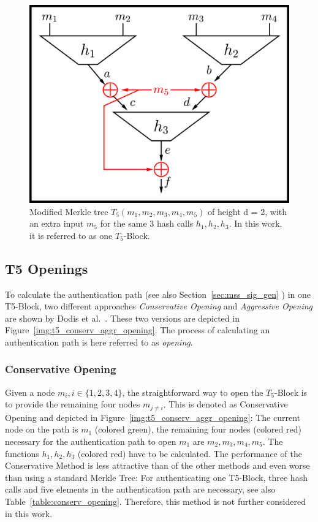 \begin{figure}
\centering
\includegraphics[]{images/Methods/abcd_paperT5_block_depiction.png}
\caption{Modified Merkle tree $T_5(m_1, m_2, m_3, m_4, m_5)$ of height d = 2,   with an extra input $m_5$ for the same 3 hash calls $h_1, h_2, h_3$. In this work, it is referred to as one $T_5$-Block.~\cite{T5_paper}}
\label{img:t5_paper_block_depiction}
\end{figure}

\subsection{T5 Openings}
To calculate the authentication path (see also Section~\ref{sec:mss_sig_gen} ) in one T5-Block, two different approaches \textit{Conservative Opening} and \textit{Aggressive Opening} are shown by Dodis et al.~\cite{T5_paper}. These two versions are depicted in Figure~\ref{img:t5_conserv_aggr_opening}.
The process of calculating an authentication path is here referred to as \textit{opening}. 

\subsubsection{Conservative Opening}
Given a node $m_i, i \in \{1,2,3,4\}$, the straightforward way to open the $T_5$-Block is to provide the remaining four nodes $m_{j \neq i}$. This is denoted as Conservative Opening and depicted in Figure~\ref{img:t5_conserv_aggr_opening}: The current node on the path is $m_1$ (colored green), the remaining four nodes (colored red) necessary for the authentication path to open $m_1$ are $m_2, m_3, m_4, m_5$. The functions $h_1, h_2, h_3$ (colored red) have to be calculated. The performance of the Conservative Method is less attractive than of the other methods and even worse than using a standard Merkle Tree: For authenticating one T5-Block, three hash calls and five elements in the authentication path are necessary, see also Table~\ref{table:conserv_opening}. Therefore, this method is not further considered in this work. %

